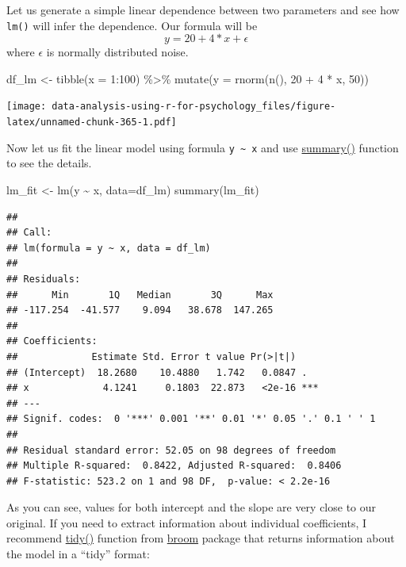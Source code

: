 \documentclass[
]{book}
\newenvironment{Shaded}{\begin{snugshade}}{\end{snugshade}}
\newcommand{\AttributeTok}[1]{\textcolor[rgb]{0.77,0.63,0.00}{#1}}
\newcommand{\DecValTok}[1]{\textcolor[rgb]{0.00,0.00,0.81}{#1}}
\newcommand{\FunctionTok}[1]{\textcolor[rgb]{0.00,0.00,0.00}{#1}}
\newcommand{\NormalTok}[1]{#1}
\newcommand{\OtherTok}[1]{\textcolor[rgb]{0.56,0.35,0.01}{#1}}
\newcommand{\SpecialCharTok}[1]{\textcolor[rgb]{0.00,0.00,0.00}{#1}}
\begin{document}
Let us generate a simple linear dependence between two parameters and see how \texttt{lm()} will infer the dependence. Our formula will be
\[ y = 20 + 4 * x + \epsilon\]
where \(\epsilon\) is normally distributed noise.

\begin{Shaded}
\begin{Highlighting}[]
\NormalTok{df\_lm }\OtherTok{\textless{}{-}}
  \FunctionTok{tibble}\NormalTok{(}\AttributeTok{x =} \DecValTok{1}\SpecialCharTok{:}\DecValTok{100}\NormalTok{) }\SpecialCharTok{\%\textgreater{}\%}
  \FunctionTok{mutate}\NormalTok{(}\AttributeTok{y =} \FunctionTok{rnorm}\NormalTok{(}\FunctionTok{n}\NormalTok{(), }\DecValTok{20} \SpecialCharTok{+} \DecValTok{4} \SpecialCharTok{*}\NormalTok{ x, }\DecValTok{50}\NormalTok{))}
\end{Highlighting}
\end{Shaded}

\texttt{[image: data-analysis-using-r-for-psychology\_files/figure-latex/unnamed-chunk-365-1.pdf]}

Now let us fit the linear model using formula \texttt{y\ \textasciitilde{}\ x} and use \href{https://stat.ethz.ch/R-manual/R-devel/library/stats/html/summary.lm.html}{summary()} function to see the details.

\begin{Shaded}
\begin{Highlighting}[]
\NormalTok{lm\_fit }\OtherTok{\textless{}{-}} \FunctionTok{lm}\NormalTok{(y }\SpecialCharTok{\textasciitilde{}}\NormalTok{ x, }\AttributeTok{data=}\NormalTok{df\_lm)}
\FunctionTok{summary}\NormalTok{(lm\_fit)}
\end{Highlighting}
\end{Shaded}

\begin{verbatim}
## 
## Call:
## lm(formula = y ~ x, data = df_lm)
## 
## Residuals:
##      Min       1Q   Median       3Q      Max 
## -117.254  -41.577    9.094   38.678  147.265 
## 
## Coefficients:
##             Estimate Std. Error t value Pr(>|t|)    
## (Intercept)  18.2680    10.4880   1.742   0.0847 .  
## x             4.1241     0.1803  22.873   <2e-16 ***
## ---
## Signif. codes:  0 '***' 0.001 '**' 0.01 '*' 0.05 '.' 0.1 ' ' 1
## 
## Residual standard error: 52.05 on 98 degrees of freedom
## Multiple R-squared:  0.8422, Adjusted R-squared:  0.8406 
## F-statistic: 523.2 on 1 and 98 DF,  p-value: < 2.2e-16
\end{verbatim}

As you can see, values for both intercept and the slope are very close to our original. If you need to extract information about individual coefficients, I recommend \href{https://broom.tidymodels.org/reference/tidy.lm.html}{tidy()} function from \href{https://github.com/tidymodels/broom}{broom} package that returns information about the model in a ``tidy'' format:
\end{document}
